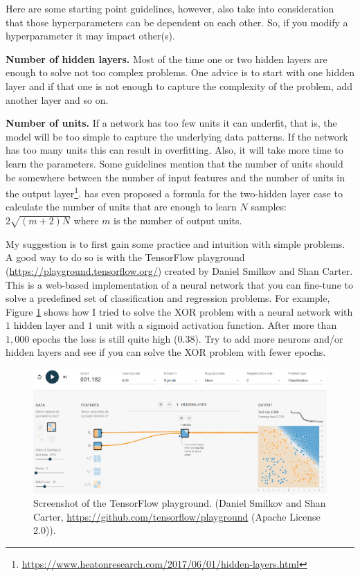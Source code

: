 \documentclass[
  11pt,
]{krantz}
\begin{document}
Here are some starting point guidelines, however, also take into consideration that those hyperparameters can be dependent on each other. So, if you modify a hyperparameter it may impact other(s).

\textbf{Number of hidden layers.}
Most of the time one or two hidden layers are enough to solve not too complex problems. One advice is to start with one hidden layer and if that one is not enough to capture the complexity of the problem, add another layer and so on.

\textbf{Number of units.}
If a network has too few units it can underfit, that is, the model will be too simple to capture the underlying data patterns. If the network has too many units this can result in overfitting. Also, it will take more time to learn the parameters. Some guidelines mention that the number of units should be somewhere between the number of input features and the number of units in the output layer\footnote{\url{https://www.heatonresearch.com/2017/06/01/hidden-layers.html}}. \citet{huang2003} has even proposed a formula for the two-hidden layer case to calculate the number of units that are enough to learn \(N\) samples: \(2\sqrt{(m+2)N}\) where \(m\) is the number of output units.

My suggestion is to first gain some practice and intuition with simple problems. A good way to do so is with the TensorFlow playground (\url{https://playground.tensorflow.org/}) created by Daniel Smilkov and Shan Carter. This is a web-based implementation of a neural network that you can fine-tune to solve a predefined set of classification and regression problems. For example, Figure \ref{fig:playground} shows how I tried to solve the XOR problem with a neural network with \(1\) hidden layer and \(1\) unit with a sigmoid activation function. After more than \(1,000\) epochs the loss is still quite high (\(0.38\)). Try to add more neurons and/or hidden layers and see if you can solve the XOR problem with fewer epochs.



\begin{figure}

{\centering \includegraphics[width=1\linewidth]{images/playground} 

}

\caption{Screenshot of the TensorFlow playground. (Daniel Smilkov and Shan Carter, \url{https://github.com/tensorflow/playground} (Apache License 2.0)).}\label{fig:playground}
\end{figure}
\end{document}
